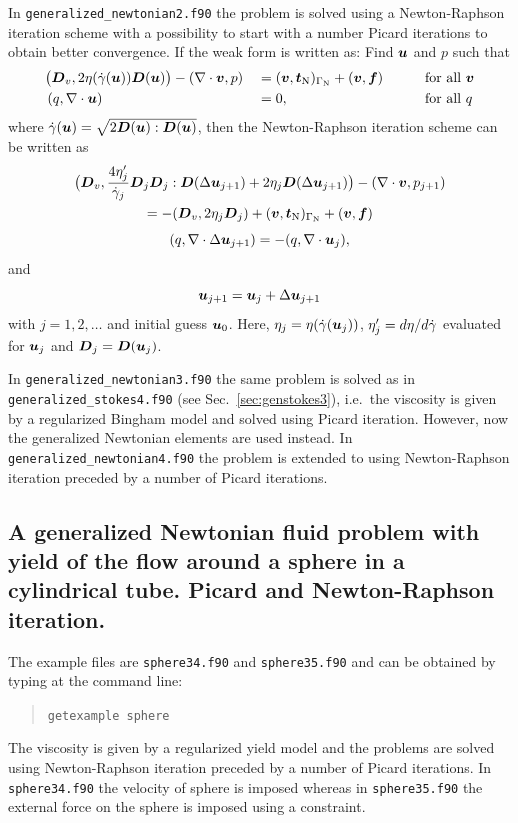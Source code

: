In \texttt{generalized\_newtonian2.f90} the problem is solved
using a Newton-Raphson iteration scheme with a possibility to start with a number Picard iterations to
obtain better convergence. If the weak form is written as:
Find $\boldsymbol{u}$ and $p$ such that
\begin{alignat*}{3}
  &\big(\boldsymbol{D}_v,2\eta(\dot\gamma(\boldsymbol{u}))\boldsymbol{D}(\boldsymbol{u})\big)
    -(\nabla\cdot\boldsymbol{v},p)&&=(\boldsymbol{v},\boldsymbol{t}_{\text{N}})_{\Gamma_{\text{N}}}+(\boldsymbol{v},\boldsymbol{f})
&\qquad&\text{for all }\boldsymbol{v}\\
  &\,(q,\nabla\cdot\boldsymbol{u})&& =0,&\qquad&\text{for all }q
\end{alignat*}
where $\dot\gamma(\boldsymbol{u})=\sqrt{2\boldsymbol{D}(\boldsymbol{u}):\boldsymbol{D}(\boldsymbol{u})}$, then the Newton-Raphson iteration scheme can be written as
\begin{multline}
  \big(\boldsymbol{D}_v,\frac{4\eta'_j}{\dot\gamma_j}\boldsymbol{D}_j\boldsymbol{D}_j:\boldsymbol{D}(\Delta \boldsymbol{u}_{j+1})+
  2\eta_{j}\boldsymbol{D}(\Delta \boldsymbol{u}_{j+1})\big)-(\nabla\cdot\boldsymbol{v},p_{j+1}) \\
= -(\boldsymbol{D}_v, 2 \eta_j \boldsymbol{D}_j)+(\boldsymbol{v},\boldsymbol{t}_{\text{N}})_{\Gamma_{\text{N}}}+(\boldsymbol{v},\boldsymbol{f})
\end{multline}
\begin{equation}
  (q,\nabla\cdot\Delta \boldsymbol{u}_{j+1}) =-(q,\nabla\cdot\boldsymbol{u}_{j}),
\end{equation}
and
\begin{equation}
  \boldsymbol{u}_{j+1} = \boldsymbol{u}_j+\Delta \boldsymbol{u}_{j+1}
\end{equation}
with $j=1,2,\ldots$ and initial guess $\boldsymbol{u}_0$. Here, $\eta_j=\eta(\dot\gamma(\boldsymbol{u}_j))$, $\eta'_j=d \eta / d \dot\gamma$ evaluated for $\boldsymbol{u}_j$ and
 $\boldsymbol{D}_j=\boldsymbol{D}(\boldsymbol{u}_j)$.
 
In \texttt{generalized\_newtonian3.f90} the same problem is solved as in \texttt{generalized\_stokes4.f90} (see Sec.~\ref{sec:genstokes3}), i.e.\
the viscosity is given by a regularized Bingham model \cite{Papanastasiou87} and solved using Picard iteration. However, now the generalized Newtonian elements are used instead. In \texttt{generalized\_newtonian4.f90} the problem is extended to using Newton-Raphson iteration preceded by a number of Picard iterations. 

\subsection{A generalized Newtonian fluid problem with yield of the flow around a sphere in a cylindrical tube.
         Picard and Newton-Raphson iteration.}
\label{sec:gennewtoniansphere}
The example files are \texttt{sphere34.f90} and \texttt{sphere35.f90}
and can be obtained by typing at the
command line:
\begin{quote}
   \texttt{getexample sphere}
\end{quote}
The viscosity is given by a regularized yield model \cite{Papanastasiou87} and the problems are solved using 
Newton-Raphson iteration preceded by a number of Picard iterations. In \texttt{sphere34.f90} the velocity of sphere is imposed whereas in \texttt{sphere35.f90} the external force on the sphere is imposed using a constraint.
         

